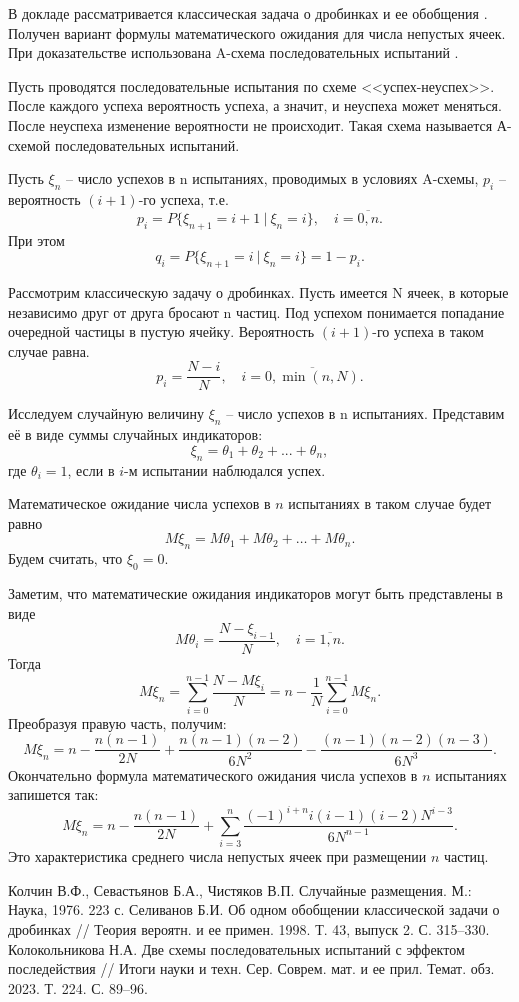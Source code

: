
В докладе рассматривается классическая задача о дробинках и ее обобщения \cite{G1,G2}. Получен вариант формулы
математического ожидания для числа непустых ячеек. При доказательстве использована A-схема последовательных испытаний \cite{G3}.


Пусть проводятся последовательные испытания по схеме <<успех-неуспех>>. После каждого успеха вероятность успеха, а значит, и неуспеха может меняться. После неуспеха изменение вероятности не происходит. Такая схема называется А-схемой последовательных испытаний.


Пусть $\xi_n$ -- число успехов в n испытаниях, проводимых в условиях A-схемы, $p_i$ -- вероятность $(i+1)$-го успеха, т.е.
$$p_i=P\{\xi_{n+1}=i+1\ | \ \xi_n=i\}, \quad i=\overline{0,n}.$$
При этом
$$q_i=P\{\xi_{n+1}=i\ |\ \xi_n=i\}=1-p_i.$$

Рассмотрим классическую задачу о дробинках. Пусть имеется N ячеек, в которые независимо друг от друга бросают n частиц. Под успехом понимается попадание очередной частицы в пустую ячейку. Вероятность $(i+1)$-го успеха в таком случае равна.
$$p_i=\frac{N-i}{N},\quad i=\overline{0,\min(n,N)}.$$

Исследуем случайную величину $\xi_n$ -- число успехов в n испытаниях.  Представим её в виде суммы случайных индикаторов:
$$\xi_n=\theta_1+\theta_2+...+\theta_n,$$
где $\theta_i = 1$, если в $i$-м испытании  наблюдался успех.

Математическое ожидание числа успехов в $n$ испытаниях в таком случае будет равно
$$M\xi_n=M\theta_1+M\theta_2+\ldots +M\theta_n.$$
Будем считать, что $\xi_0 = 0$.

Заметим, что математические ожидания индикаторов могут быть представлены в виде
$$M\theta_i=\frac{N-\xi_{i-1}}{N},\quad i=\overline{1,n}.$$
Тогда
$$M\xi_n=\sum_{i=0}^{n-1}\frac{N-M\xi_i}{N}=n-\frac{1}{N}\sum_{i=0}^{n-1}M\xi_n.$$
Преобразуя правую часть, получим:
$$M\xi_n=n-\frac{n(n-1)}{2N}+\frac{n(n-1)(n-2)}{6N^2}-\frac{(n-1)(n-2)(n-3)}{6N^3}.$$
Окончательно формула математического ожидания числа успехов в $n$ испытаниях запишется так: 
$$M\xi_n=n-\frac{n(n-1)}{2N}+\sum_{i=3}^n\frac{(-1)^{i+n}i(i-1)(i-2)N^{i-3}}{6N^{n-1}}.$$
Это характеристика среднего числа непустых ячеек при размещении $n$ частиц.

\begin{thebibliography}{99}
Колчин В.Ф., Севастьянов Б.А., Чистяков В.П. Случайные размещения. М.:
Наука, 1976. 223 с. 
 Селиванов Б.И. Об одном обобщении классической задачи
о дробинках // Теория вероятн. и ее примен.  1998. Т. 43,
выпуск 2. С. 315--330.
 Колокольникова Н.А. Две схемы последовательных испытаний с эффектом последействия // Итоги науки и техн. Сер. Соврем. мат. и ее прил. Темат.
обз.  2023. Т. 224. С. 89--96. 
\end{thebibliography}






%
